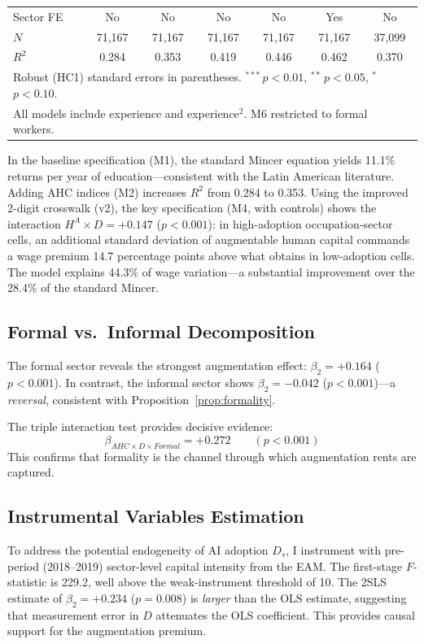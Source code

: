 \documentclass[11pt,a4paper]{article}
\theoremstyle{definition}
\begin{document}
\begin{table}[htbp]
\begin{tabular}{lcccccc}
\midrule
Sector FE & No & No & No & No & Yes & No \\
$N$ & 71,167 & 71,167 & 71,167 & 71,167 & 71,167 & 37,099 \\
$R^2$ & 0.284 & 0.353 & 0.419 & 0.446 & 0.462 & 0.370 \\
\bottomrule
\multicolumn{7}{l}{\footnotesize Robust (HC1) standard errors in parentheses. $^{***}$\,$p<0.01$, $^{**}$\,$p<0.05$, $^*$\,$p<0.10$.}\\
\multicolumn{7}{l}{\footnotesize All models include experience and experience$^2$. M6 restricted to formal workers.}
\end{tabular}
\end{table}

In the baseline specification (M1), the standard Mincer equation yields 11.1\% returns per year of education---consistent with the Latin American literature. Adding AHC indices (M2) increases $R^2$ from 0.284 to 0.353. Using the improved 2-digit crosswalk (v2), the key specification (M4, with controls) shows the interaction $H^A \times D = +0.147$ ($p < 0.001$): in high-adoption occupation-sector cells, an additional standard deviation of augmentable human capital commands a wage premium 14.7 percentage points above what obtains in low-adoption cells. The model explains 44.3\% of wage variation---a substantial improvement over the 28.4\% of the standard Mincer.

\subsection{Formal vs.\ Informal Decomposition}

The formal sector reveals the strongest augmentation effect: $\beta_2 = +0.164$ ($p < 0.001$). In contrast, the informal sector shows $\beta_2 = -0.042$ ($p < 0.001$)---a \textit{reversal}, consistent with Proposition~\ref{prop:formality}.

The triple interaction test provides decisive evidence:
\begin{equation}
\beta_{AHC \times D \times Formal} = +0.272 \qquad (p < 0.001)
\end{equation}
This confirms that formality is the channel through which augmentation rents are captured.

\subsection{Instrumental Variables Estimation}

To address the potential endogeneity of AI adoption $D_s$, I instrument with pre-period (2018--2019) sector-level capital intensity from the EAM. The first-stage $F$-statistic is 229.2, well above the weak-instrument threshold of 10. The 2SLS estimate of $\beta_2 = +0.234$ ($p = 0.008$) is \textit{larger} than the OLS estimate, suggesting that measurement error in $D$ attenuates the OLS coefficient. This provides causal support for the augmentation premium.
\end{document}
